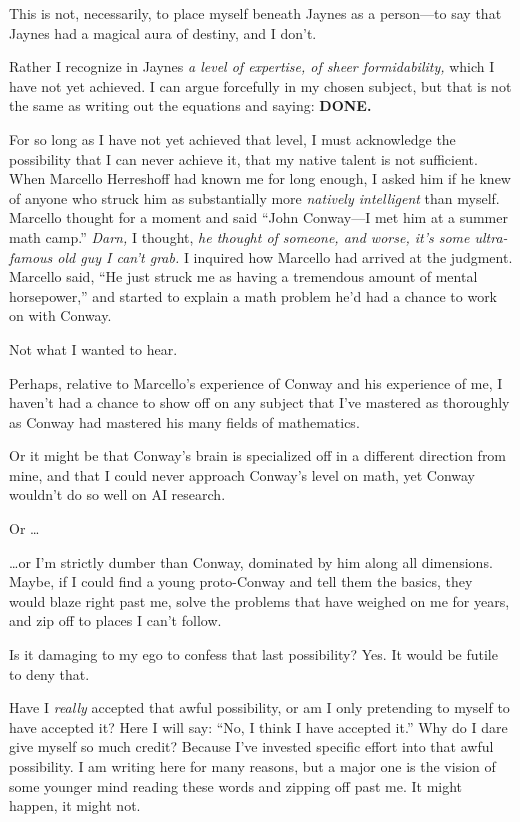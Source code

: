 {
 This is not, necessarily, to place myself beneath Jaynes as a
person---to say that Jaynes had a magical aura of destiny, and I
don't.}

{
 Rather I recognize in Jaynes \textit{a level of expertise, of
sheer formidability,} which I have not yet achieved. I can argue
forcefully in my chosen subject, but that is not the same as writing
out the equations and saying: \textbf{DONE.}}

{
 For so long as I have not yet achieved that level, I must
acknowledge the possibility that I can never achieve it, that my native
talent is not sufficient. When Marcello Herreshoff had known me for
long enough, I asked him if he knew of anyone who struck him as
substantially more \textit{natively intelligent} than myself. Marcello
thought for a moment and said ``John Conway---I met
him at a summer math camp.'' \textit{Darn,} I
thought, \textit{he thought of someone, and worse, it's
some ultra-famous old guy I can't grab.} I inquired how
Marcello had arrived at the judgment. Marcello said,
``He just struck me as having a tremendous amount of
mental horsepower,'' and started to explain a math
problem he'd had a chance to work on with Conway.}

{
 Not what I wanted to hear.}

{
 Perhaps, relative to Marcello's experience of
Conway and his experience of me, I haven't had a chance
to show off on any subject that I've mastered as
thoroughly as Conway had mastered his many fields of mathematics.}

{
 Or it might be that Conway's brain is specialized
off in a different direction from mine, and that I could never approach
Conway's level on math, yet Conway
wouldn't do so well on AI research.}

{
 Or \ldots}

{
 \ldots or I'm strictly dumber than Conway,
dominated by him along all dimensions. Maybe, if I could find a young
proto-Conway and tell them the basics, they would blaze right past me,
solve the problems that have weighed on me for years, and zip off to
places I can't follow.}

{
 Is it damaging to my ego to confess that last possibility? Yes. It
would be futile to deny that.}

{
 Have I \textit{really} accepted that awful possibility, or am I
only pretending to myself to have accepted it? Here I will say:
``No, I think I have accepted it.''
Why do I dare give myself so much credit? Because I've
invested specific effort into that awful possibility. I am writing here
for many reasons, but a major one is the vision of some younger mind
reading these words and zipping off past me. It might happen, it might
not.}

